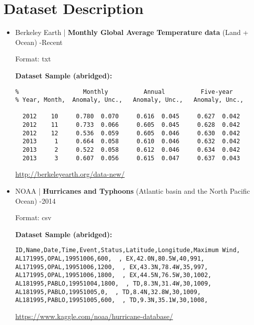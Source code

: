 \documentclass[fontsize=11pt]{article}
\begin{document}
\section*{Dataset Description}
\begin{itemize}

    \item Berkeley Earth | \textbf{Monthly Global Average Temperature data} (Land + Ocean) -Recent
    
    Format: txt
    
    \medskip
    
    \textbf{Dataset Sample (abridged):}
    \begin{verbatim}
%                  Monthly          Annual          Five-year   
% Year, Month,  Anomaly, Unc.,   Anomaly, Unc.,   Anomaly, Unc.,

  2012    10     0.780  0.070     0.616  0.045     0.627  0.042 
  2012    11     0.733  0.066     0.605  0.045     0.628  0.042 
  2012    12     0.536  0.059     0.605  0.046     0.630  0.042 
  2013     1     0.664  0.058     0.610  0.046     0.632  0.042 
  2013     2     0.522  0.058     0.612  0.046     0.634  0.042 
  2013     3     0.607  0.056     0.615  0.047     0.637  0.043 
    \end{verbatim}
    \url{http://berkeleyearth.org/data-new/}
    
    \bigskip
    
    \item NOAA | \textbf{Hurricanes and Typhoons} (Atlantic
basin and the North Pacific Ocean) -2014

    Format: csv
    
    \medskip
    
    \textbf{Dataset Sample (abridged):}
    \begin{verbatim}
ID,Name,Date,Time,Event,Status,Latitude,Longitude,Maximum Wind,
AL171995,OPAL,19951006,600,  , EX,42.0N,80.5W,40,991,
AL171995,OPAL,19951006,1200,  , EX,43.3N,78.4W,35,997,
AL171995,OPAL,19951006,1800,  , EX,44.5N,76.5W,30,1002,
AL181995,PABLO,19951004,1800,  , TD,8.3N,31.4W,30,1009,
AL181995,PABLO,19951005,0,  , TD,8.4N,32.8W,30,1009,
AL181995,PABLO,19951005,600,  , TD,9.3N,35.1W,30,1008,
    \end{verbatim}
    \url{https://www.kaggle.com/noaa/hurricane-database/}
    
\end{itemize}
\end{document}
